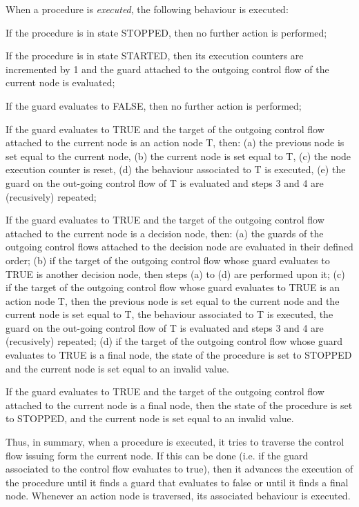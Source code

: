 \documentclass[definition]{../fwprofile}
\begin{document}
When a procedure is \emph{executed}, the following behaviour is executed:
\begin{fw_enumerate}
\item If the procedure is in state STOPPED, then no further action is performed;
\item If the procedure is in state STARTED, then its execution counters are incremented
by 1 and the guard attached to the outgoing control flow of the current node is evaluated;
\item If the guard evaluates to FALSE, then no further action is performed;
\item If the guard evaluates to TRUE and the target of the outgoing control flow attached to
the current node is an action node T, then: (a) the previous node is set equal to the current
node, (b) the current node is set equal to T, (c) the node execution counter is reset, (d) the
behaviour associated to T is executed, (e) the guard on the out-going control flow of T is evaluated
and steps 3 and 4 are (recusively) repeated;
\item If the guard evaluates to TRUE and the target of the outgoing control flow attached to
the current node is a decision node, then: (a) the guards of the outgoing control flows
attached to the decision node are evaluated in their defined order; (b) if the target of the outgoing control
flow whose guard evaluates to TRUE is another decision node, then steps (a) to (d) are
performed upon it; (c) if the target of the outgoing control flow whose guard evaluates
to TRUE is an action node T, then the previous node is set equal to the current node 
and the current node is set equal to T, the behaviour
associated to T is executed, the guard on the out-going control flow of T is evaluated
and steps 3 and 4 are (recusively) repeated; (d) if the target of the
outgoing control flow whose guard evaluates to TRUE is a final node, the state of the
procedure is set to STOPPED and the current node is set equal to an invalid value.
\item If the guard evaluates to TRUE and the target of the outgoing control flow attached to
the current node is a final node, then the state of the procedure is set to STOPPED,
and the current node is set equal to an invalid value.
\end{fw_enumerate}

Thus, in summary, when a procedure is executed, it tries to traverse the control flow issuing
form the current node. If this can be done (i.e. if the guard associated to the control flow
evaluates to true), then it advances the execution of the procedure until it finds a guard that
evaluates to false or until it finds a final node. Whenever an action node is traversed, its
associated behaviour is executed.
\end{document}
